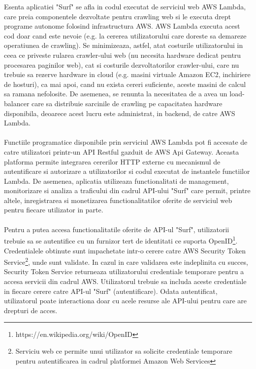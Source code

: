 \newcommand{\AWSSTS}{Serviciu web ce permite unui utilizator sa solicite credentiale temporare pentru autentificarea in cadrul platformei Amazon Web Services}

Esenta aplicatiei "Surf" se afla in codul executat de serviciul web AWS Lambda, care preia componentele dezvoltate pentru crawling web si le executa drept programe autonome folosind infrastructura AWS. AWS Lambda executa acest cod doar cand este nevoie (e.g. la cererea utilizatorului care doreste sa demareze operatiunea de crawling). Se minimizeaza, astfel, atat costurile utilizatorului in ceea ce priveste rularea crawler-ului web (nu necesita hardware dedicat pentru procesarea paginilor web), cat si costurile dezvoltatorilor crawler-ului, care nu trebuie sa rezerve hardware in cloud (e.g. masini virtuale Amazon EC2, inchiriere de hosturi), ca mai apoi, cand nu exista cereri suficiente, aceste masini de calcul sa ramana nefolosite. De asemenea, se renunta la necesitatea de a avea un load-balancer care sa distribuie sarcinile de crawling pe capacitatea hardware disponibila, deoarece acest lucru este administrat, in backend, de catre AWS Lambda.
\\
\\
Functiile programatice disponibile prin serviciul AWS Lambda pot fi accesate de catre utilizatori printr-un API Restful gazduit de AWS Api Gateway. Aceasta platforma permite integrarea cererilor HTTP externe cu mecanismul de autentificare si autorizare a utilizatorilor si codul executat de instantele functiilor Lambda. De asemenea, aplicatia utilizeaza functionalitati de management, monitorizare si analiza a traficului din cadrul API-ului "Surf" care permit, printre altele, inregistrarea si monetizarea functionalitatilor oferite de serviciul web pentru fiecare utilizator in parte. 
\\
\\
Pentru a putea accesa functionalitatile oferite de API-ul "Surf", utilizatorii trebuie sa se autentifice cu un furnizor tert de identitati ce suporta OpenID\footnote{https://en.wikipedia.org/wiki/OpenID}. Credentialele obtinute sunt impachetate intr-o cerere catre AWS Security Token Service\footnote{\AWSSTS}, unde sunt validate. In cazul in care validarea este indeplinita cu succes, Security Token Service returneaza utilizatorului credentiale temporare pentru a accesa servicii din cadrul AWS. Utilizatorul trebuie sa includa aceste credentiale in fiecare cerere catre API-ul "Surf" (autentificare). Odata autentificat, utilizatorul poate interactiona doar cu acele resurse ale API-ului pentru care are drepturi de acces. 
\newpage

